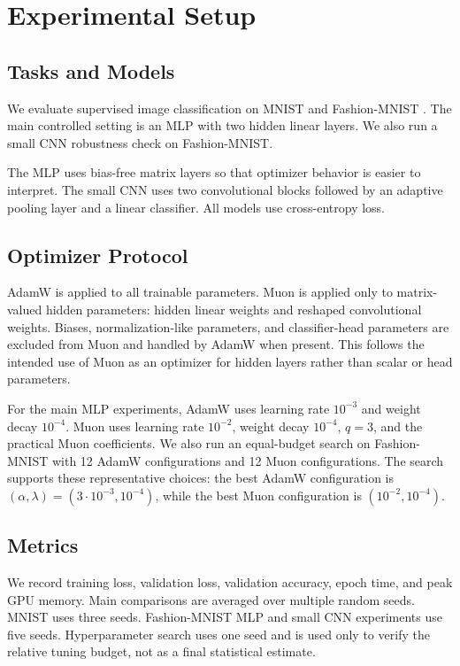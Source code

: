 \documentclass{article}
\begin{document}
\section{Experimental Setup}

\subsection{Tasks and Models}

We evaluate supervised image classification on MNIST \citep{lecun1998mnist} and Fashion-MNIST \citep{xiao2017fashion}. The main controlled setting is an MLP with two hidden linear layers. We also run a small CNN robustness check on Fashion-MNIST.

The MLP uses bias-free matrix layers so that optimizer behavior is easier to interpret. The small CNN uses two convolutional blocks followed by an adaptive pooling layer and a linear classifier. All models use cross-entropy loss.

\subsection{Optimizer Protocol}

AdamW is applied to all trainable parameters. Muon is applied only to matrix-valued hidden parameters: hidden linear weights and reshaped convolutional weights. Biases, normalization-like parameters, and classifier-head parameters are excluded from Muon and handled by AdamW when present. This follows the intended use of Muon as an optimizer for hidden layers rather than scalar or head parameters.

For the main MLP experiments, AdamW uses learning rate $10^{-3}$ and weight decay $10^{-4}$. Muon uses learning rate $10^{-2}$, weight decay $10^{-4}$, $q=3$, and the practical Muon coefficients. We also run an equal-budget search on Fashion-MNIST with 12 AdamW configurations and 12 Muon configurations. The search supports these representative choices: the best AdamW configuration is $(\alpha,\lambda)=(3\cdot10^{-3},10^{-4})$, while the best Muon configuration is $(10^{-2},10^{-4})$.

\subsection{Metrics}

We record training loss, validation loss, validation accuracy, epoch time, and peak GPU memory. Main comparisons are averaged over multiple random seeds. MNIST uses three seeds. Fashion-MNIST MLP and small CNN experiments use five seeds. Hyperparameter search uses one seed and is used only to verify the relative tuning budget, not as a final statistical estimate.
\end{document}
